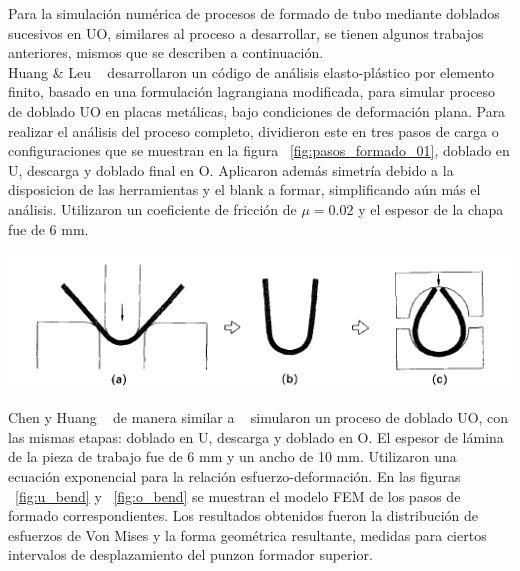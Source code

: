 Para la simulación numérica de procesos de formado de tubo mediante doblados sucesivos en UO, 
similares al proceso a desarrollar, se tienen algunos trabajos anteriores, mismos que se describen 
a continuación.\\

Huang & Leu ~\cite{huang1995} desarrollaron un código de análisis elasto-plástico por elemento finito, 
basado en una formulación lagrangiana modificada, para simular proceso de doblado UO en placas metálicas, 
bajo condiciones de deformación plana. Para realizar el análisis del proceso completo, dividieron este 
en tres pasos de carga o configuraciones que se muestran en la figura ~\ref{fig:pasos_formado_01}, 
doblado en U, descarga y doblado final en O. Aplicaron además simetría debido a la disposicion de las 
herramientas y el blank a formar, simplificando aún más el análisis. Utilizaron un coeficiente 
de fricción de $\mu = 0.02$ y el espesor de la chapa fue de 6 mm. \\

\begin{center}
\includegraphics[scale=1.0]{src/ch1/uo-bending.png}
 \label{fig:pasos_formado_01}
\end{center}


Chen y Huang ~\cite{chen2007} de manera similar a ~\cite{huang1995} simularon un proceso de doblado 
UO, con las mismas etapas: doblado en U, descarga y doblado en O. El espesor de lámina de la pieza 
de trabajo fue de 6 mm y un ancho de 10 mm. Utilizaron una ecuación exponencial para la relación 
esfuerzo-deformación.  En las figuras ~\ref{fig:u_bend} y ~\ref{fig:o_bend} se muestran el modelo 
FEM de los pasos de formado correspondientes. Los resultados obtenidos fueron la distribución 
de esfuerzos de Von Mises y la forma geométrica resultante, medidas para ciertos intervalos 
de desplazamiento del punzon formador superior.

